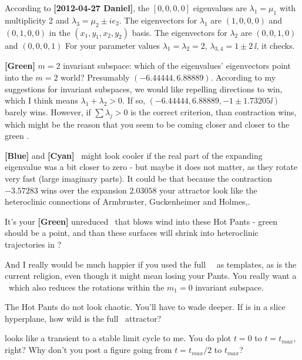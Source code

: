 \begin{description}
According to {\bf [2012-04-27 Daniel]},
the $[0,0,0,0]$ eigenvalues are $\lambda_1 = \mu_1$ with multiplicity 2 and
             $\lambda_3 = \mu_2 \pm i e_2$. The eigenvectors for
             $\lambda_1$ are $(1,0,0,0)$ and $(0,1,0,0)$ in the
             $(x_1,y_1,x_2,y_2)$ basis.
             The eigenvectors for
             $\lambda_2$ are $(0,0,1,0)$ and $(0,0,0,1)$
For your parameter values
             $\lambda_1 = \lambda_2= 2$,
             $\lambda_{3,4} = 1 \pm  2\,\ii$, it checks.

{\bf [Green]} $m=2$ invariant subspace: which of the eigenvalues' eigenvectors
    point into the $m=2$ world? Presumably $(-6.44444,6.88889)$.
    According to my suggestions for invariant subspaces, we would like
    repelling directions to win, which I think means $\lambda_1+\lambda_2
    >0$. If so, $(-6.44444,6.88889,-1 \pm 1.73205\ii)$ barely wins.
    However, if $\sum \lambda_j >0$ is the correct criterion, than contraction
    wins, which might be the reason that you seem to be coming closer and
    closer to the green \rpo.

{\bf [Blue]} and {\bf [Cyan]} \eqva\ might look cooler if the real part
of the expanding eigenvalue was a bit closer to zero - but maybe it does
not matter, as they rotate very fast (large imaginary parts). It could be
that because the contraction $-3.57283$ wins over the expansion $2.03058$
your attractor look like the heteroclinic connections of Armbruster,
Guckenheimer and Holmes,.

It's your {\bf [Green]} unreduced \rpo\ that blows wind into these Hot
Pants - green should be a point, and than these surfaces will shrink into
heteroclinic trajectories in \reducedsp?

And I really would be much happier if you used the full \statesp\ \eqva\
as templates, as is the current religion, even though it might mean
losing your Pants.  You really want a \slice\ which also reduces the
rotations within the $m_1=0$ invariant subspace.

\item[2012-04-28 Predrag] The Hot Pants do not look chaotic.  You'll have
to wade deeper. If \reffig{fig:2moderedmultieq} is in a slice hyperplane,
how wild is the full \statesp\ attractor?

\item[2012-04-28 Evangelos to Keith]  looks like a transient
to a stable limit cycle to me. You do plot $t=0$ to $t=t_{max}$, right? Why don't
you post a figure going from $t=t_{max}/2$ to $t_{max}$?


\end{description}
